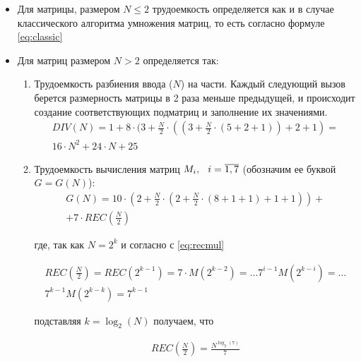 \begin{itemize}[label=---]
	\item Для матрицы, размером $N \leq 2$ трудоемкость определяется как и в случае классического алгоритма умножения матриц, то есть согласно формуле \ref{eq:classic}
	\item Для матриц размером $N > 2$ определяется так:
	\begin{enumerate}[label={\arabic*)}]
		\item Трудоемкость разбиения ввода ($N$) на части. Каждый следующий вызов берется размерность матрицы в 2 раза меньше предыдущей, и происходит создание
		соответствующих подматриц и заполнение их значениями.
		\begin{equation}
			\label{eq:div}
			\begin{gathered}
				DIV(N) = 1 + 8 \cdot (3 + \frac{N}{2} \cdot ((3 + \frac{N}{2} \cdot (5 + 2 + 1)) + 2 + 1) = \\ 16 \cdot N^2 + 24 \cdot N + 25
			\end{gathered}
		\end{equation}
		\item Трудоемкость вычисления матриц $M_i, \hspace{0.25cm} i = \overline{1, 7}$ (обозначим ее буквой $G = G(N)$):
		\begin{equation}
			\label{eq:G}
			\begin{gathered}
				G(N) = 10 \cdot (2 + \frac{N}{2} \cdot (2 + \frac{N}{2} \cdot (8 + 1 + 1) + 1 + 1)) + \\
				+ 7 \cdot REC(\frac{N}{2})
			\end{gathered}
		\end{equation}
		
		где, так как $N = 2^k$ и согласно с \ref{eq:recmul}
		
		\begin{equation}
			\begin{gathered}
				REC(\frac{N}{2}) = REC(2^{k-1}) = 7 \cdot M(2^{k-2}) = \ldots 7^{i-1} M(2^{k-i}) = \ldots \\
				7^{k-1} M(2^{k-k}) = 7^{k-1}
			\end{gathered}
		\end{equation}
		
		подставляя $k = \log_2(N)$ получаем, что 
		
		\begin{equation}
			\begin{gathered}
				REC(\frac{N}{2}) = \frac{N^{\log_2(7)}}{7}
			\end{gathered}
		\end{equation}
		

\end{enumerate}
\end{itemize}
